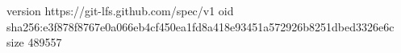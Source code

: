version https://git-lfs.github.com/spec/v1
oid sha256:e3f878f8767e0a066eb4cf450ea1fd8a418e93451a572926b8251dbed3326e6c
size 489557
